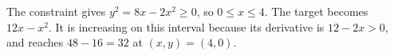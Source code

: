 The constraint gives $y^2=8x-2x^2\ge 0$, so $0\le x\le 4$. The target becomes $12x-x^2$. It is increasing on this interval because its derivative is $12-2x>0$, and reaches $48-16=\boxed{32}$ at $(x,y)=(4,0)$.
